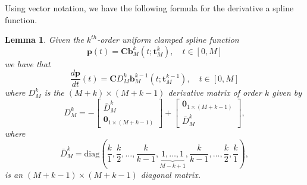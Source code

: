 \documentclass{article}
\newtheorem{lemma}[theorem]{Lemma}
\newcommand{\bbf}{\mathbf{b}}
\newcommand{\Cbf}{\mathbf{C}}
\begin{document}
Using vector notation, we have the following formula for the derivative a spline function.
\begin{lemma} \label{lem:derivative_of_spline}
Given the $k^{th}$-order uniform clamped spline function
\[
\mathbf{p}(t) = \Cbf \bbf_M^k(t; \mathbf{t}_M^k), \quad t\in[0, M]
\]
we have that
\[
\frac{d\mathbf{p}}{dt}(t) = \Cbf D_M^k \bbf_M^{k-1}(t; \mathbf{t}_M^{k-1}), \quad t\in[0, M]
\]	
where $D_M^k$ is the $(M+k)\times (M+k-1)$ derivative matrix of order $k$ given by
\begin{equation}\label{eq:D_k}
D_M^k = -\begin{bmatrix}\bar{D}_M^k \\ \mathbf{0}_{1\times(M+k-1)} \end{bmatrix} + \begin{bmatrix}\mathbf{0}_{1\times(M+k-1)} \\ \bar{D}_M^k \end{bmatrix},
\end{equation}
where
\begin{equation}\label{eq:D_k_bar}
\bar{D}_M^k = \text{diag}\left(\frac{k}{1}, \frac{k}{2}, \dots, \frac{k}{k-1}, \underbrace{1, \dots, 1}_{M-k+1}, \frac{k}{k-1}, \dots, \frac{k}{2}, \frac{k}{1}\right),
\end{equation}
is an $(M+k-1)\times(M+k-1)$ diagonal matrix.
\end{lemma}
\end{document}
